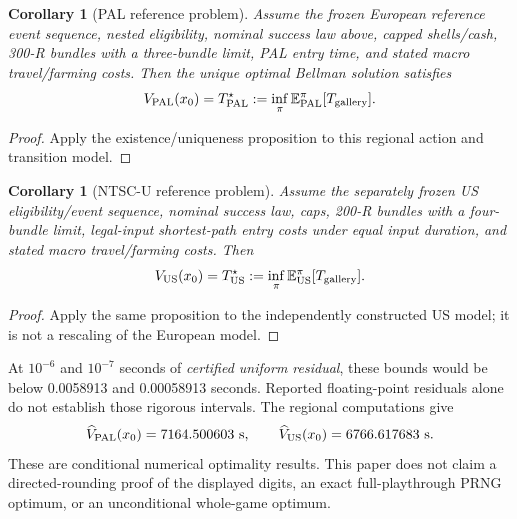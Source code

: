 \documentclass[11pt]{article}
\newtheorem{corollary}[theorem]{Corollary}
\theoremstyle{definition}\newtheorem{definition}[theorem]{Definition}
\newcommand{\E}{\mathbb E}\newcommand{\R}{\mathcal R}
\begin{document}
\begin{corollary}[PAL reference problem]
Assume the frozen European reference event sequence, nested eligibility, nominal success law above, capped shells/cash, 300-R bundles with a three-bundle limit, PAL entry time, and stated macro travel/farming costs. Then the unique optimal Bellman solution satisfies
\[
 V_{\rm PAL}(x_0)=T^\star_{\rm PAL}:=\inf_\pi\E_{\rm PAL}^{\pi}[T_{\rm gallery}].
\]
\end{corollary}
\begin{proof}Apply the existence/uniqueness proposition to this regional action and transition model.\end{proof}
\begin{corollary}[NTSC-U reference problem]
Assume the separately frozen US eligibility/event sequence, nominal success law, caps, 200-R bundles with a four-bundle limit, legal-input shortest-path entry costs under equal input duration, and stated macro travel/farming costs. Then
\[
 V_{\rm US}(x_0)=T^\star_{\rm US}:=\inf_\pi\E_{\rm US}^{\pi}[T_{\rm gallery}].
\]
\end{corollary}
\begin{proof}Apply the same proposition to the independently constructed US model; it is not a rescaling of the European model.\end{proof}

At $10^{-6}$ and $10^{-7}$ seconds of \emph{certified uniform residual}, these bounds would be below 0.0058913 and 0.00058913 seconds. Reported floating-point residuals alone do not establish those rigorous intervals. The regional computations give
\[
 \widehat V_{\rm PAL}(x_0)=7164.500603\ \mathrm{s},\qquad
 \widehat V_{\rm US}(x_0)=6766.617683\ \mathrm{s}.
\]
These are conditional numerical optimality results. This paper does not claim a directed-rounding proof of the displayed digits, an exact full-playthrough PRNG optimum, or an unconditional whole-game optimum.
\end{document}

